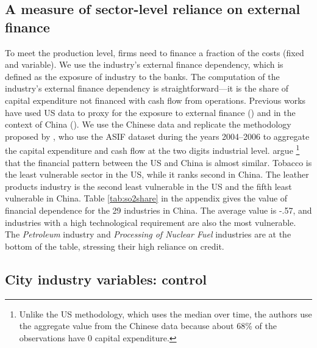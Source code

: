 \documentclass[12pt]{article}
\begin{document}
\subsection{A measure of sector-level reliance on external finance} \label{sec:fin}

To meet the production level, firms need to finance a fraction of the costs (fixed and variable). We use the industry’s external finance dependency, which is defined as the exposure of industry to the banks. The computation of the industry’s external finance dependency is straightforward—it is the share of capital expenditure not financed with cash flow from operations. Previous works have used US data to proxy for the exposure to external finance (\cite{Rajan1998-tn, Claessens2002-mj, Kroszner2007-gt}) and in the context of China (\cite{Jarreau2014-lb, Manova2015-zk, Fan2015-bm}). We use the Chinese data and replicate the methodology proposed by \cite{Fan2015-bm}, who use the ASIF dataset during the years 2004–2006 to aggregate the capital expenditure and cash flow at the two digits industrial level. \cite{Fan2015-bm} argue \footnote{Unlike the US methodology, which uses the median over time, the authors use the aggregate value from the Chinese data because about 68\% of the observations have 0 capital expenditure.} that the financial pattern between the US and China is almost similar. Tobacco is the least vulnerable sector in the US, while it ranks second in China. The leather products industry is the second least vulnerable in the US and the fifth least vulnerable in China. Table \ref{tab:so2share} in the appendix gives the value of financial dependence for the 29 industries in China. The average value is -.57, and industries with a high technological requirement are also the most vulnerable. The \textit{Petroleum} industry and \textit{Processing of Nuclear Fuel} industries are at the bottom of the table, stressing their high reliance on credit.

\subsection{City industry variables: control} \label{sec:control}
\end{document}
